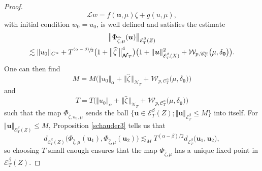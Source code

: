 \documentclass[10pt]{amsart}
\newcommand{\psfrac}[2]{\sfrac{(#1)}{#2}}
\theoremstyle{definition}
\newcommand{\bfzero}{\mathbf{0}}
\newcommand{\mcE}{\mathcal{E}}
\newcommand{\mcN}{\mathcal{N}}
\newcommand\mcW{\mathcal W}
\newcommand{\bsu}{\boldsymbol{u}}
\newcommand{\scrC}{\ensuremath{\mathscr{C}}}
\newcommand{\dab}{\mcE^\beta_T}
\newcommand{\norme}[1]{\Vert #1 \Vert}
\newcommand{\scrL}{\mathscr{L}}
\begin{document}
\begin{proof}
\[
\scrL w = f(\bsu,\mu) \zeta + g(u,\mu),
\]
with initial condition $w_0=u_0$, is well defined and satisfies the estimate
\begin{multline}\label{estimee111}
\big\Vert\Phi_{\widehat\zeta, \mu}(\bsu)\big\Vert_{\mcE^\beta_T(Z)}\\
\lesssim \norme{u_0}_{C^\alpha} + T^{\psfrac{\alpha-\beta}{2}}\bigl(1+\big\Vert\widehat\zeta\hspace{2pt}\big\Vert_{{\boldsymbol{\mcN}}_T}^4 \bigr)\bigl(1 + \norme\bsu_{\dab(X)}^2 + \mcW_{p,\scrC_T^\alpha}\bigl(\mu,\delta_\bfzero\bigr)\bigr).
\end{multline}
One can then find
\[
M = M\bigl(\norme{u_0}_\alpha+\hspace{1pt} \Vert\widehat\zeta\hspace{2pt}\Vert_{{\boldsymbol{\mcN}}_T} + \hspace{1pt}\mcW_{p,\scrC^\alpha_T}\bigl(\mu,\delta_\bfzero\bigr)\bigr)
\]
and
\[
T=T\bigl(\norme{u_0}_\alpha+ \hspace{1pt}\Vert\widehat\zeta\hspace{1pt}\Vert_{{\boldsymbol{\mcN}}_T}+ \hspace{1pt} \mcW_{p,\scrC^\alpha_T}\bigl(\mu,\delta_\bfzero\bigr)\bigr)
\]
such that the map $\Phi_{\widehat\zeta,u_0,\mu}$ sends the ball $\bigl\{ \bsu\in \mcE^\beta_T(Z); \norme\bsu_{\mcE^\beta_T}\leq M \bigr\}$ into itself. For $\norme\bsu_{\mcE^\beta_T(Z)}\leq M$, Proposition \ref{schauder3} tells us that
\[
d_{\mcE^\beta_T(Z)}\bigl(\Phi_{\widehat\zeta,\mu}(\bsu_1),\Phi_{\widehat\zeta,\mu}(\bsu_2)\bigr) \lesssim_M T^{(\alpha-\beta)/2} d_{\dab}\bigl(\bsu_1, \bsu_2\bigr),
\]
so choosing $T$ small enough ensures that the map $\Phi_{\widehat\zeta,\mu}$ has a unique fixed point in $\mcE^\beta_T(Z)$.


\end{proof}
\end{document}
